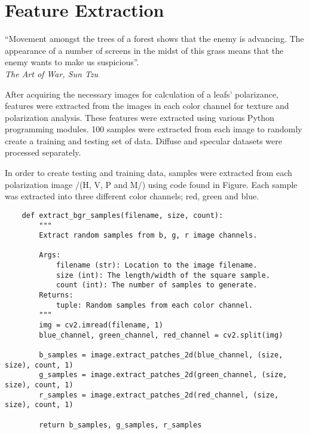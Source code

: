 \chapter{Feature Extraction}
\begin{center}
  \begin{minipage}{0.75\textwidth}
    \begin{small}
      “Movement amongst the trees of a forest shows that the enemy is advancing.  The appearance of a number of screens in the midst of this grass means that the enemy wants to make us suspicious”.\\
      \null\hfill\emph{The Art of War, Sun Tzu}
    \end{small}
  \end{minipage}
  \vspace{0.5cm}
\end{center}

After acquiring the necessary images for calculation of a leafs' polarizance, features were extracted from the images in each color channel for texture and polarization analysis.  These features were extracted using various Python programming modules. 100 samples were extracted from each image to randomly create a training and testing set of data.  Diffuse and specular datasets were processed separately.

In order to create testing and training data, samples were extracted from each polarization image /(H, V, P and M/) using code found in Figure.  Each sample was extracted into three different color channels; red, green and blue.
\begin{lstlisting}
    def extract_bgr_samples(filename, size, count):
        """
        Extract random samples from b, g, r image channels.

        Args:
            filename (str): Location to the image filename.
            size (int): The length/width of the square sample.
            count (int): The number of samples to generate.
        Returns:
            tuple: Random samples from each color channel.
        """
        img = cv2.imread(filename, 1)
        blue_channel, green_channel, red_channel = cv2.split(img)

        b_samples = image.extract_patches_2d(blue_channel, (size, size), count, 1)
        g_samples = image.extract_patches_2d(green_channel, (size, size), count, 1)
        r_samples = image.extract_patches_2d(red_channel, (size, size), count, 1)

        return b_samples, g_samples, r_samples
\end{lstlisting}

